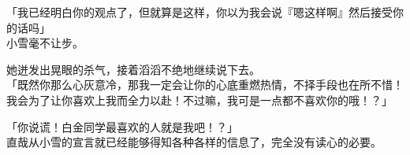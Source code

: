 「我已经明白你的观点了，但就算是这样，你以为我会说『嗯这样啊』然后接受你的话吗」\\

小雪毫不让步。

她迸发出晃眼的杀气，接着滔滔不绝地继续说下去。\\

「既然你那么心灰意冷，那我一定会让你的心底重燃热情，不择手段也在所不惜！我会为了让你喜欢上我而全力以赴！不过嘛，我可是一点都不喜欢你的哦！？」

「你说谎！白金同学最喜欢的人就是我吧！？」\\

直哉从小雪的宣言就已经能够得知各种各样的信息了，完全没有读心的必要。
